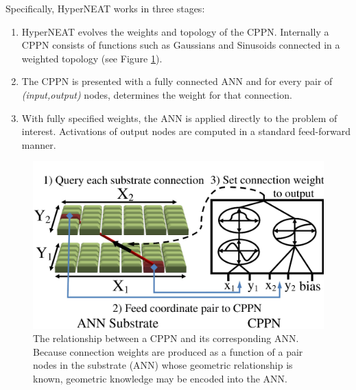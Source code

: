 \documentclass{acm_proc_article-sp}
\begin{document}
Specifically, HyperNEAT works in three stages:

\begin{enumerate}
\item HyperNEAT evolves the weights and topology of the CPPN. Internally a CPPN consists of functions such as Gaussians and Sinusoids connected in a weighted topology (see Figure \ref{fig:cppn}).
\item The CPPN is presented with a fully connected ANN and for every pair of \emph{(input,output)} nodes, determines the weight for that connection.
\item With fully specified weights, the ANN is applied directly to the problem of interest. Activations of output nodes are computed in a standard feed-forward manner.
\end{enumerate}



\begin{figure}[htp]
\begin{center}
\includegraphics[width=\columnwidth]{figures/cppn}
\end{center}
\caption{The relationship between a CPPN and its corresponding ANN. Because connection weights are produced as a function of a pair nodes in the substrate (ANN) whose geometric relationship is known, geometric knowledge may be encoded into the ANN.}
\label{fig:cppn}
\end{figure}
\end{document}
